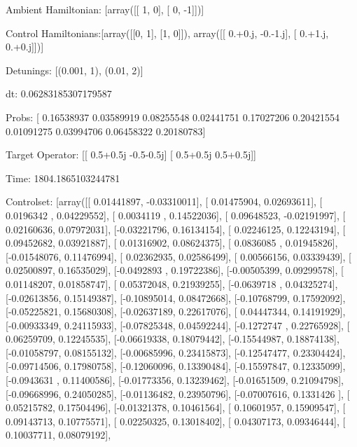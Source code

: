 \documentclass{article}
\begin{document}
    

\newpage

Ambient Hamiltonian: [array([[ 1,  0],
       [ 0, -1]])]

Control Hamiltonians:[array([[0, 1],
       [1, 0]]), array([[ 0.+0.j, -0.-1.j],
       [ 0.+1.j,  0.+0.j]])]

Detunings: [(0.001, 1), (0.01, 2)]

 dt: 0.06283185307179587

Probs: [ 0.16538937  0.03589919  0.08255548  0.02441751  0.17027206  0.20421554
  0.01091275  0.03994706  0.06458322  0.20180783]

Target Operator: [[ 0.5+0.5j -0.5-0.5j]
 [ 0.5+0.5j  0.5+0.5j]]

Time: 1804.1865103244781

Controlset: [array([[ 0.01441897, -0.03310011],
       [ 0.01475904,  0.02693611],
       [ 0.0196342 ,  0.04229552],
       [ 0.0034119 ,  0.14522036],
       [ 0.09648523, -0.02191997],
       [ 0.02160636,  0.07972031],
       [-0.03221796,  0.16134154],
       [ 0.02246125,  0.12243194],
       [ 0.09452682,  0.03921887],
       [ 0.01316902,  0.08624375],
       [ 0.0836085 ,  0.01945826],
       [-0.01548076,  0.11476994],
       [ 0.02362935,  0.02586499],
       [ 0.00566156,  0.03339439],
       [ 0.02500897,  0.16535029],
       [-0.0492893 ,  0.19722386],
       [-0.00505399,  0.09299578],
       [ 0.01148207,  0.01858747],
       [ 0.05372048,  0.21939255],
       [-0.0639718 ,  0.04325274],
       [-0.02613856,  0.15149387],
       [-0.10895014,  0.08472668],
       [-0.10768799,  0.17592092],
       [-0.05225821,  0.15680308],
       [-0.02637189,  0.22617076],
       [ 0.04447344,  0.14191929],
       [-0.00933349,  0.24115933],
       [-0.07825348,  0.04592244],
       [-0.1272747 ,  0.22765928],
       [ 0.06259709,  0.12245535],
       [-0.06619338,  0.18079442],
       [-0.15544987,  0.18874138],
       [-0.01058797,  0.08155132],
       [-0.00685996,  0.23415873],
       [-0.12547477,  0.23304424],
       [-0.09714506,  0.17980758],
       [-0.12060096,  0.13390484],
       [-0.15597847,  0.12335099],
       [-0.0943631 ,  0.11400586],
       [-0.01773356,  0.13239462],
       [-0.01651509,  0.21094798],
       [-0.09668996,  0.24050285],
       [-0.01136482,  0.23950796],
       [-0.07007616,  0.1331426 ],
       [ 0.05215782,  0.17504496],
       [-0.01321378,  0.10461564],
       [ 0.10601957,  0.15909547],
       [ 0.09143713,  0.10775571],
       [ 0.02250325,  0.13018402],
       [ 0.04307173,  0.09346444],
       [ 0.10037711,  0.08079192],
\end{document}
